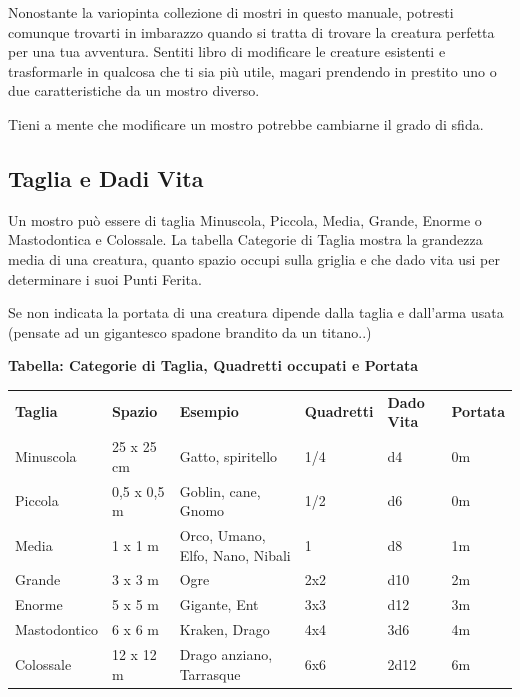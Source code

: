 \begin{multicols}{2}
Nonostante la variopinta collezione di mostri in questo manuale, potresti comunque trovarti in imbarazzo quando si tratta di trovare la creatura perfetta per una tua avventura. Sentiti libro di modificare le creature esistenti e trasformarle in qualcosa che ti sia più utile, magari prendendo in prestito uno o due caratteristiche da un mostro diverso.

Tieni a mente che modificare un mostro potrebbe cambiarne il grado di sfida.

\subsection{Taglia e Dadi Vita}

Un mostro può essere di taglia Minuscola, Piccola, Media, Grande, Enorme o Mastodontica e Colossale. La tabella Categorie di Taglia mostra la grandezza media di una creatura, quanto spazio occupi sulla griglia e che dado vita usi per determinare i suoi Punti Ferita.

Se non indicata la portata di una creatura dipende dalla taglia e dall'arma usata (pensate ad un gigantesco spadone brandito da un titano..)

\end{multicols}

\textbf{Tabella: Categorie di Taglia, Quadretti occupati e Portata}

\medskip

\begin{tabularx}{0.95\textwidth}{llllll}
\toprule
\textbf{Taglia}& \textbf{Spazio} & \textbf{Esempio}&\textbf{Quadretti}&\textbf{Dado Vita}&\textbf{Portata}\\
Minuscola & 25 x 25 cm&Gatto, spiritello& 1/4&d4&0m\\
Piccola & 0,5 x 0,5 m & Goblin, cane, Gnomo&1/2&d6&0m\\
Media & 1 x 1 m & Orco, Umano, Elfo, Nano, Nibali &1&d8&1m\\
Grande & 3 x 3 m& Ogre&2x2&d10&2m\\
Enorme & 5 x 5 m & Gigante, Ent&3x3&d12&3m\\
Mastodontico & 6 x 6 m&Kraken, Drago&4x4&3d6&4m\\
Colossale & 12 x 12 m&Drago anziano, Tarrasque&6x6&2d12&6m\\
\end{tabularx}

